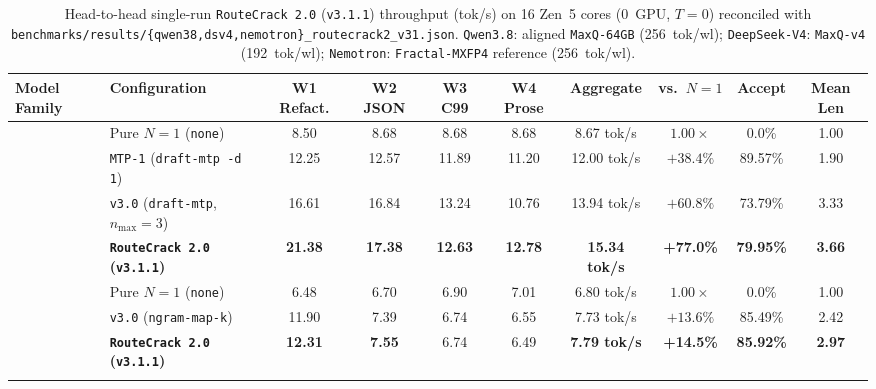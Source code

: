 \documentclass[10pt,twocolumn]{article}
\begin{document}
\begin{table}[t]
\centering
\caption{Head-to-head single-run \texttt{RouteCrack 2.0} (\texttt{v3.1.1}) throughput (tok/s) on 16 Zen~5 cores (0~GPU, $T=0$) reconciled with \texttt{benchmarks/results/\{qwen38,dsv4,nemotron\}\_routecrack2\_v31.json}. \texttt{Qwen3.8}: aligned \texttt{MaxQ-64GB} (256~tok/wl); \texttt{DeepSeek-V4}: \texttt{MaxQ-v4} (192~tok/wl); \texttt{Nemotron}: \texttt{Fractal-MXFP4} reference (256~tok/wl).}
\label{tab:rc2}
\scriptsize
\renewcommand{\arraystretch}{1.15}
\setlength{\tabcolsep}{3.5pt}
\begin{tabularx}{\textwidth}{@{}lLcccccccc@{}}
\toprule
\textbf{Model Family} & \textbf{Configuration} & \textbf{W1 Refact.} & \textbf{W2 JSON} & \textbf{W3 C99} & \textbf{W4 Prose} & \textbf{Aggregate} & \textbf{vs.\ $N=1$} & \textbf{Accept} & \textbf{Mean Len} \\
\midrule
{}
 & Pure $N=1$ (\texttt{none}) & 8.50 & 8.68 & 8.68 & 8.68 & 8.67 tok/s & $1.00\times$ & 0.0\% & 1.00 \\
 & \texttt{MTP-1} (\texttt{draft-mtp -d 1}) & 12.25 & 12.57 & 11.89 & 11.20 & 12.00 tok/s & $+38.4\%$ & 89.57\% & 1.90 \\
 & \texttt{v3.0} (\texttt{draft-mtp}, $n_{\max}=3$) & 16.61 & 16.84 & 13.24 & 10.76 & 13.94 tok/s & $+60.8\%$ & 73.79\% & 3.33 \\
 & \textbf{\texttt{RouteCrack 2.0} (\texttt{v3.1.1})} & \textbf{21.38} & \textbf{17.38} & \textbf{12.63} & \textbf{12.78} & \textbf{15.34 tok/s} & \textbf{+77.0\%} & \textbf{79.95\%} & \textbf{3.66} \\
\midrule
{}
 & Pure $N=1$ (\texttt{none}) & 6.48 & 6.70 & 6.90 & 7.01 & 6.80 tok/s & $1.00\times$ & 0.0\% & 1.00 \\
 & \texttt{v3.0} (\texttt{ngram-map-k}) & 11.90 & 7.39 & 6.74 & 6.55 & 7.73 tok/s & $+13.6\%$ & 85.49\% & 2.42 \\
 & \textbf{\texttt{RouteCrack 2.0} (\texttt{v3.1.1})} & \textbf{12.31} & \textbf{7.55} & 6.74 & 6.49 & \textbf{7.79 tok/s} & \textbf{+14.5\%} & \textbf{85.92\%} & \textbf{2.97} \\
\midrule
{}

\end{tabularx}
\end{table}
\end{document}
